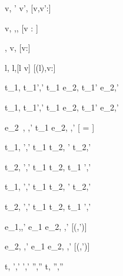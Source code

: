 

  { }
  {\Edit v,\hat{\sigma} ' \Edit v',\hat{\sigma}}
  [v,v':\tau]

  { }
  {\Edit v,\sigma \handle{\Empty} \Enter \tau,\sigma,\True}
  [v : \tau]

  { }
  {\Enter \tau,\hat{\sigma}  \Edit v,\hat{\sigma}}
  [v:\tau]

  { }
  {\Update l,\hat{\sigma}  \Update l,\hat{\sigma}[l \mapsto v]}
  [\sigma(l),v:\tau]

  {t_1,\sigma {} t_1',\sigma'}
  {t_1 \Then e_2,\sigma {} t_1' \Then e_2,\sigma'}

  {t_1,\sigma {} t_1',\sigma'}
  {t_1 \Next e_2,\sigma {} t_1' \Next e_2,\sigma'}

  {e_2\ ,\sigma \hat{\normalise} ,\hat{\sigma}'}
  {t_1 \Next e_2,\sigma \xrightarrow[]{\Continue} ,\hat{\sigma}'}
  [ =  \land \neg{}]


  {t_1,\sigma {} ',\hat{\sigma}'}
  {t_1 \And t_2,\sigma {} ' \And t_2,\hat{\sigma}'}

  {t_2,\sigma {} ',\hat{\sigma}'}
  {t_1 \And t_2,\sigma {} t_1 \And {}',\hat{\sigma}'}


  {t_1,\sigma {} ',\hat{\sigma}'}
  {t_1 \Or t_2,\sigma {} ' \Or t_2,\hat{\sigma}'}

  {t_2,\sigma {} ',\hat{\sigma}' }
  {t_1 \Or t_2,\sigma {} t_1 \Or {}',\hat{\sigma}'}


  {e_1,\sigma \normalise {},\hat{\sigma}'}
  {e_1 \Xor e_2,\sigma \xrightarrow[]{\Left} ,\hat{\sigma}'}
  [\neg\Failing(,\hat{\sigma}')]

  {e_2,\sigma \hat{\normalise} ,\hat{\sigma}'}
  {e_1 \Xor e_2,\sigma \xrightarrow[]{\Right} ,\hat{\sigma}'}
  [\neg\Failing(,\hat{\sigma}')]





  {t,\sigma {} ',\hat{\sigma}' \Quad
   ',\hat{\sigma}' \hat{\normalise} '',\hat{\sigma}''}
  {t,\sigma {} '',\hat{\sigma}''}
